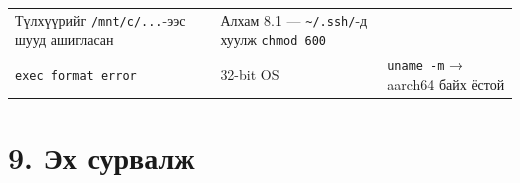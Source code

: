 \begin{longtable}[]{@{}lll@{}}
\begin{minipage}[t]{0.30\columnwidth}
Түлхүүрийг \texttt{/mnt/c/...}-ээс шууд ашигласан\strut
\end{minipage} & \begin{minipage}[t]{0.30\columnwidth}\raggedright
Алхам 8.1 --- \texttt{\textasciitilde{}/.ssh/}-д хуулж \texttt{chmod\ 600}\strut
\end{minipage}\tabularnewline
\begin{minipage}[t]{0.30\columnwidth}\raggedright
\texttt{exec\ format\ error}\strut
\end{minipage} & \begin{minipage}[t]{0.30\columnwidth}\raggedright
32-bit OS\strut
\end{minipage} & \begin{minipage}[t]{0.30\columnwidth}\raggedright
\texttt{uname\ -m} → aarch64 байх ёстой\strut
\end{minipage}\tabularnewline
\bottomrule
\end{longtable}\endgroup

\hypertarget{ux44dux445-ux441ux443ux440ux432ux430ux43bux436}{%
\section{9. Эх сурвалж}\label{ux44dux445-ux441ux443ux440ux432ux430ux43bux436}}

